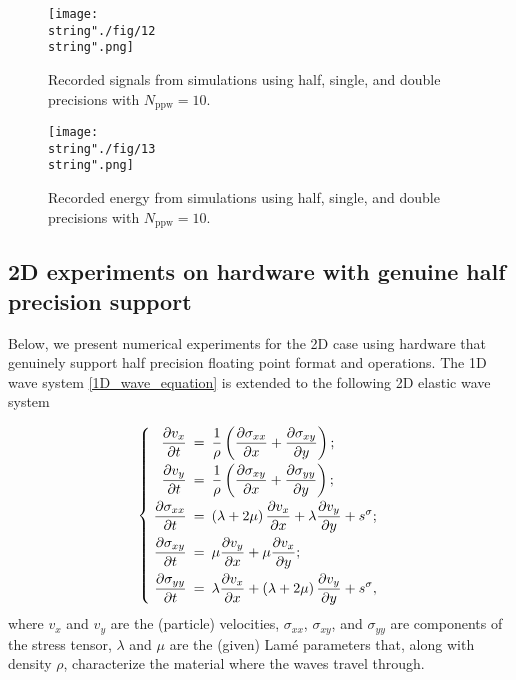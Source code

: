 \documentclass[10pt]{article}
\begin{document}
\begin{figure}[H]
\captionsetup{width=1\textwidth, font=footnotesize,labelfont=footnotesize}
\centering
%
\centering\texttt{[image: \\string"./fig/12\\string".png]}
%
\caption{Recorded signals from simulations using half, single, and double precisions with $N_\text{ppw}=10$.}
\label{comparison_V_half_compensated_single_double_ppw_10_seg_98_100}
\end{figure}


\begin{figure}[H]
\captionsetup{width=1\textwidth, font=footnotesize,labelfont=footnotesize}
\centering
%
\centering\texttt{[image: \\string"./fig/13\\string".png]}
%
\caption{Recorded energy from simulations using half, single, and double precisions with $N_\text{ppw}=10$.}
\label{comparison_E_half_compensated_single_double_ppw_10_seg_0_100}
\end{figure}


\subsection{2D experiments on hardware with genuine half precision support}\label{sec_example_2D}
%
Below, we present numerical experiments for the 2D case using hardware that genuinely support half precision floating point format and operations.
%
The 1D wave system \eqref{1D_wave_equation} is extended to the following 2D elastic wave system

\begin{equation}
\label{2D_elastic_wave_equation}
\left\{
\arraycolsep=2.5pt%
\begin{array}{rcl}
\displaystyle \frac{\partial v_x}{\partial t} &=& \displaystyle \frac{1}{\rho} \left( \frac{\partial \sigma_{xx}}{\partial x} + \frac{\partial \sigma_{xy}}{\partial y} \right); 
\\[2ex]
\displaystyle \frac{\partial v_y}{\partial t} &=& \displaystyle \frac{1}{\rho} \left( \frac{\partial \sigma_{xy}}{\partial x} + \frac{\partial \sigma_{yy}}{\partial y} \right); 
\\[2ex]
\displaystyle \frac{\partial \sigma_{xx}}{\partial t} &=& \displaystyle \left(\lambda + 2\mu\right) \frac{\partial v_x}{\partial x} + \lambda \frac{\partial v_y}{\partial y} + s^\sigma; 
\\[2ex]
\displaystyle \frac{\partial \sigma_{xy}}{\partial t} &=& \displaystyle \mu \frac{\partial v_y}{\partial x} + \mu \frac{\partial v_x}{\partial y}; 
\\[2ex]
\displaystyle \frac{\partial \sigma_{yy}}{\partial t} &=& \displaystyle \lambda \frac{\partial v_x}{\partial x} + \left(\lambda + 2\mu\right) \frac{\partial v_y}{\partial y} + s^\sigma,
\end{array}
\right.
\end{equation}
where $v_x$ and $v_y$ are the (particle) velocities, $\sigma_{xx}$, $\sigma_{xy}$, and $\sigma_{yy}$ are components of the stress tensor, $\lambda$ and $\mu$ are the (given) Lam\'{e} parameters that, along with density $\rho$, characterize the material where the waves travel through.
\end{document}
